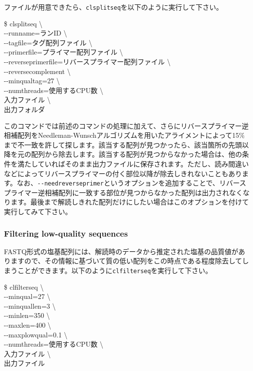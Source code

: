 \documentclass[titlepage,10pt,a4paper,english]{jsbook}
\newenvironment{cmd}{\begin{oframed}\raggedright\ttfamily\footnotesize\setlength{\baselineskip}{1.4em}}{\end{oframed}\vspace{-1em}}
\begin{document}
ファイルが用意できたら、\texttt{clsplitseq}を以下のように実行して下さい。
\begin{cmd}
\$ clsplitseq {\textbackslash}\\
{-}{-}runname=ランID {\textbackslash}\\
{-}{-}tagfile=タグ配列ファイル {\textbackslash}\\
{-}{-}primerfile=プライマー配列ファイル {\textbackslash}\\
{-}{-}reverseprimerfile=リバースプライマー配列ファイル {\textbackslash}\\
{-}{-}reversecomplement {\textbackslash}\\
{-}{-}minqualtag=27 {\textbackslash}\\
{-}{-}numthreads=使用するCPU数 {\textbackslash}\\
入力ファイル {\textbackslash}\\
出力フォルダ
\end{cmd}
このコマンドでは前述のコマンドの処理に加えて、さらにリバースプライマー逆相補配列をNeedleman-Wunschアルゴリズムを用いたアライメントによって15\%まで不一致を許して探します。該当する配列が見つかったら、該当箇所の先頭以降を元の配列から除去します。該当する配列が見つからなかった場合は、他の条件を満たしていればそのまま出力ファイルに保存されます。ただし、読み間違いなどによってリバースプライマーの付く部位以降が除去しきれないこともあります。なお、\texttt{{-}{-}needreverseprimer}というオプションを追加することで、リバースプライマー逆相補配列に一致する部位が見つからなかった配列は出力されなくなります。最後まで解読しきれた配列だけにしたい場合はこのオプションを付けて実行してみて下さい。

\subsubsection{Filtering low-quality sequences}\label{subsubsection:qualityfilteringfor454}

FASTQ形式の塩基配列には、解読時のデータから推定された塩基の品質値がありますので、その情報に基づいて質の低い配列をこの時点である程度除去してしまうことができます。以下のように\texttt{clfilterseq}を実行して下さい。

\begin{cmd}
\$ clfilterseq {\textbackslash}\\
{-}{-}minqual=27 {\textbackslash}\\
{-}{-}minquallen=3 {\textbackslash}\\
{-}{-}minlen=350 {\textbackslash}\\
{-}{-}maxlen=400 {\textbackslash}\\
{-}{-}maxplowqual=0.1 {\textbackslash}\\
{-}{-}numthreads=使用するCPU数 {\textbackslash}\\
入力ファイル {\textbackslash}\\
出力ファイル
\end{cmd}
\end{document}
